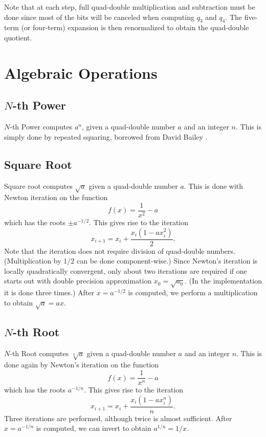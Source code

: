 \documentclass[11pt]{article}
\theoremstyle{definition}
\begin{document}
Note that at each step, full quad-double multiplication and 
subtraction must be done since most of the bits will be canceled
when computing $q_3$ and $q_4$.  The five-term (or four-term)
expansion is then renormalized to obtain the quad-double quotient.

\section{Algebraic Operations} \label{sec:algebraic}
\subsection{$N$-th Power}
$N$-th Power computes $a^n$, given a quad-double number $a$ and an
integer $n$.  This is simply done by repeated squaring, borrowed
from David Bailey \cite{bai-dd}. 

\subsection{Square Root}
Square root computes $\sqrt{a}$ given a quad-double number $a$.
This is done with Newton iteration on the function
\begin{displaymath}
  f(x) = \frac{1}{x^2} - a
\end{displaymath}
which has the roots $\pm a^{-1/2}$. This gives rise to the iteration
\begin{displaymath}
  x_{i+1} = x_i + \frac{x_i (1 - ax_i^2)}{2}.
\end{displaymath}
Note that the iteration does not require division of quad-double
numbers.  (Multiplication by $1/2$ can be done component-wise.)
Since Newton's iteration is locally quadratically convergent, 
only about two iterations are required if one starts out with
double precision approximation $x_0 = \sqrt{a_0}$.  (In the
implementation it is done three times.)  After $x = a^{-1/2}$ is
computed, we perform a multiplication to obtain $\sqrt{a} = ax$.

\subsection{$N$-th Root}
$N$-th Root computes $\sqrt[n]{a}$ given a quad-double number $a$
and an integer $n$.  This is done again by Newton's iteration on
the function
\begin{displaymath}
  f(x) = \frac{1}{x^n} - a
\end{displaymath}
which has the roots $a^{-1/n}$. This gives rise to the iteration
\begin{displaymath}
  x_{i+1} = x_i + \frac{x_i (1 - ax_i^n)}{n}.
\end{displaymath}
Three iterations are performed, although twice is almost sufficient.
After $x = a^{-1/n}$ is computed, we can invert to obtain $a^{1/n} = 1/x$.
\end{document}
